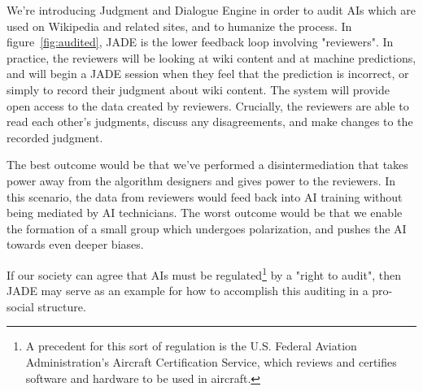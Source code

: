 \documentclass[format=sigconf, authorversion]{acmart}
\begin{document}
We're introducing Judgment and Dialogue Engine in order to audit AIs which are used on Wikipedia and related sites, and to humanize the process.  In figure~\ref{fig:audited}, JADE is the lower feedback loop involving "reviewers".  In practice, the reviewers will be looking at wiki content and at machine predictions, and will begin a JADE session when they feel that the prediction is incorrect, or simply to record their judgment about wiki content.  The system will provide open access to the data created by reviewers.  Crucially, the reviewers are able to read each other's judgments, discuss any disagreements, and make changes to the recorded judgment.

The best outcome would be that we've performed a disintermediation that takes power away from the algorithm designers and gives power to the reviewers.  In this scenario, the data from reviewers would feed back into AI training without being mediated by AI technicians.  The worst outcome would be that we enable the formation of a small group which undergoes polarization, and pushes the AI towards even deeper biases.

If our society can agree that AIs must be regulated\footnote{A precedent for this sort of regulation is the U.S. Federal Aviation Administration's Aircraft Certification Service, which reviews and certifies software and hardware to be used in aircraft.} by a "right to audit", then JADE may serve as an example for how to accomplish this auditing in a pro-social structure.


\end{document}
